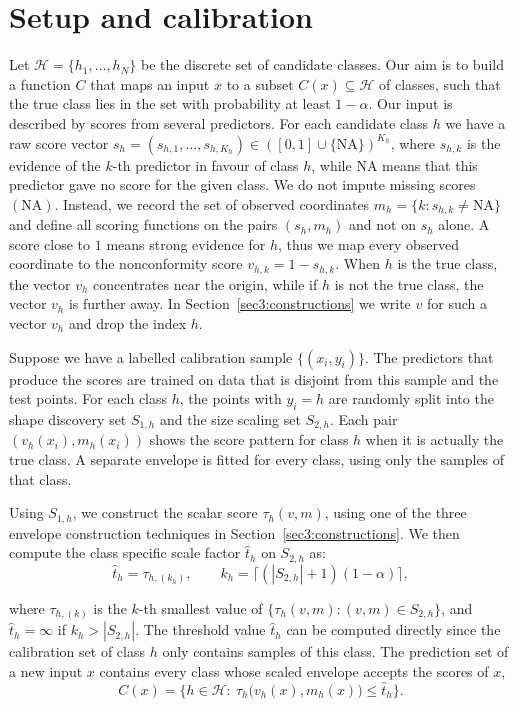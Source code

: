 \section{Setup and calibration}\label{sec:setup}

Let $\mathcal H=\{h_1,\dots,h_N\}$ be the discrete set of candidate classes. Our aim is to build a function $C$ that maps an 
input $x$ to a subset $C(x)\subseteq\mathcal H$ of classes, such that the true class lies in the set with probability at least 
$1-\alpha$. Our input is described by scores from several predictors. For each candidate class $h$ we have a raw score vector 
$s_h=(s_{h,1},\dots,s_{h,K_h})\in([0,1]\cup\{\mathrm{NA}\})^{K_h}$, where $s_{h,k}$ is the evidence of the $k$-th predictor in 
favour of class $h$, while $\mathrm{NA}$ means that this predictor gave no score for the given class. We do not impute missing 
scores $(\mathrm{NA})$. Instead, we record the set of observed coordinates $m_h=\{k:s_{h,k}\neq\mathrm{NA}\}$ and define all 
scoring functions on the pairs $(s_h,m_h)$ and not on $s_h$ alone. A score close to $1$ means strong evidence for $h$, thus we 
map every observed coordinate to the nonconformity score $v_{h,k}=1-s_{h,k}$. When $h$ is the true class, the vector $v_h$ 
concentrates near the origin, while if $h$ is not the true class, the vector $v_h$ is further away. In 
Section~\ref{sec3:constructions} we write $v$ for such a vector $v_h$ and drop the index $h$.

Suppose we have a labelled calibration sample $\{(x_i,y_i)\}$. The predictors that produce the scores are trained on data that 
is disjoint from this sample and the test points. For each class $h$, the points with $y_i=h$ are randomly split into the shape  
discovery set $S_{1,h}$ and the size scaling set $S_{2,h}$. Each pair $(v_h(x_i),m_h(x_i))$ shows the score pattern for class 
$h$ when it is actually the true class. A separate envelope is fitted for every class, using only the samples of that class.

Using $S_{1,h}$, we construct the scalar score $\tau_h(v,m)$, using one of the three envelope construction techniques in 
Section~\ref{sec3:constructions}. We then compute the class specific scale factor $\hat t_h$ on $S_{2,h}$ as:
\begin{equation}\label{eq:qhat}
\hat t_h=\tau_{h,(k_h)},\qquad k_h=\lceil(|S_{2,h}|+1)(1-\alpha)\rceil,
\end{equation}

where $\tau_{h,(k)}$ is the $k$-th smallest value of $\{\tau_h(v,m):(v,m)\in S_{2,h}\}$, and $\hat t_h=\infty$ if 
$k_h>|S_{2,h}|$. The threshold value $\hat t_h$ can be computed directly since the calibration set of class $h$ only contains 
samples of this class. The prediction set of a new input $x$ contains every class whose scaled envelope accepts the scores of $x$,
\begin{equation}\label{eq:set}
C(x)=\bigl\{h\in\mathcal H:\ \tau_h\bigl(v_h(x),m_h(x)\bigr)\le\hat t_h\bigr\}.
\end{equation}


